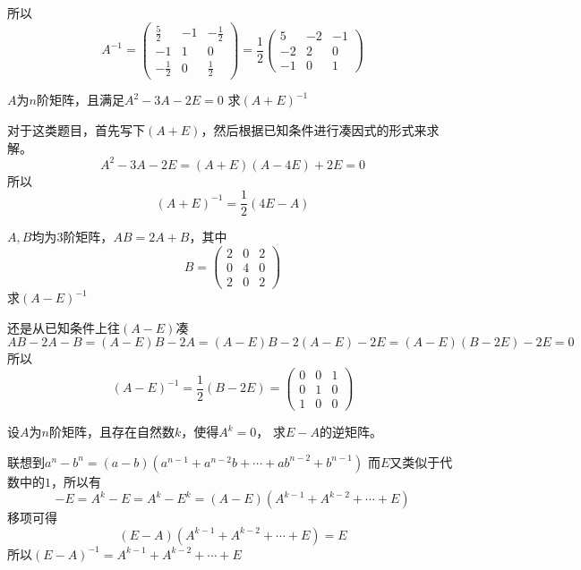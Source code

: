 \begin{solution}
    所以
    \[
        A^{-1} =
        \begin{pmatrix}
            \frac{5}{2}  & -1 & -\frac{1}{2} \\
            -1           & 1  & 0            \\
            -\frac{1}{2} & 0  & \frac{1}{2}
        \end{pmatrix}
        =\frac{1}{2}
        \begin{pmatrix}
            5  & -2 & -1 \\
            -2 & 2  & 0  \\
            -1 & 0  & 1
        \end{pmatrix}
    \]
\end{solution}

\begin{example}
    $A$为$n$阶矩阵，且满足$A^2 - 3A - 2E =0$
    求$(A+E)^{-1}$
\end{example}
\begin{solution}
    对于这类题目，首先写下$(A+E)$，然后根据已知条件进行凑因式的形式来求解。
    \[ A^2 - 3A - 2E = (A+E)(A - 4E) + 2E = 0 \]
    所以
    \[ (A+E)^{-1} = \frac{1}{2}(4E-A) \]
\end{solution}
\begin{example}
    $A,B$均为$3$阶矩阵，$AB=2A+B$，其中
    \[
        B = \begin{pmatrix}
            2 & 0 & 2 \\
            0 & 4 & 0 \\
            2 & 0 & 2
        \end{pmatrix}
    \]
    求$(A-E)^{-1}$
\end{example}
\begin{solution}
    还是从已知条件上往$(A-E)$凑
    \[ AB - 2A - B =(A-E)B - 2A = (A-E)B - 2(A-E) - 2E = (A-E)(B-2E) - 2E = 0  \]
    所以
    \[
        (A-E)^{-1} = \frac{1}{2}(B-2E) =
        \begin{pmatrix}
            0 & 0 & 1 \\
            0 & 1 & 0 \\
            1 & 0 & 0
        \end{pmatrix}
    \]
\end{solution}
\begin{example}
    设$A$为$n$阶矩阵，且存在自然数$k$，使得$A^k=0$，
    求$E-A$的逆矩阵。
\end{example}
\begin{solution}
    联想到$a^n-b^n=(a-b)(a^{n-1} + a^{n-2}b + \cdots + ab^{n-2} + b^{n-1})$
    而$E$又类似于代数中的$1$，所以有
    \[ -E = A^k - E = A^k - E^k = (A-E)(A^{k-1} + A^{k-2} + \cdots + E) \]
    移项可得
    \[ (E-A)(A^{k-1} + A^{k-2} + \cdots + E) = E \]
    所以$(E-A)^{-1}= A^{k-1} + A^{k-2} + \cdots + E$
\end{solution}

